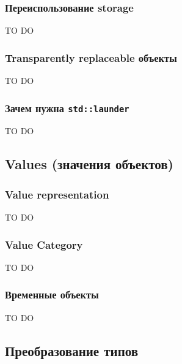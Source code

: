 \documentclass{article}
\begin{document}
\subsubsection{Переиспользование storage}

TO DO

\subsubsection{Transparently replaceable объекты}

TO DO

\subsubsection{Зачем нужна \texttt{std::launder}}
\label{section::Launder}
TO DO

%

\subsection{Values (значения объектов)}
\label{section::ObjValue}

\subsubsection{Value representation}

TO DO

\subsubsection{Value Category}
\label{section::ValueCategory}

TO DO

\subsubsection{Временные объекты}
\label{section::TemporaryObjects}

TO DO

%

\subsection{Преобразование типов}
\end{document}
